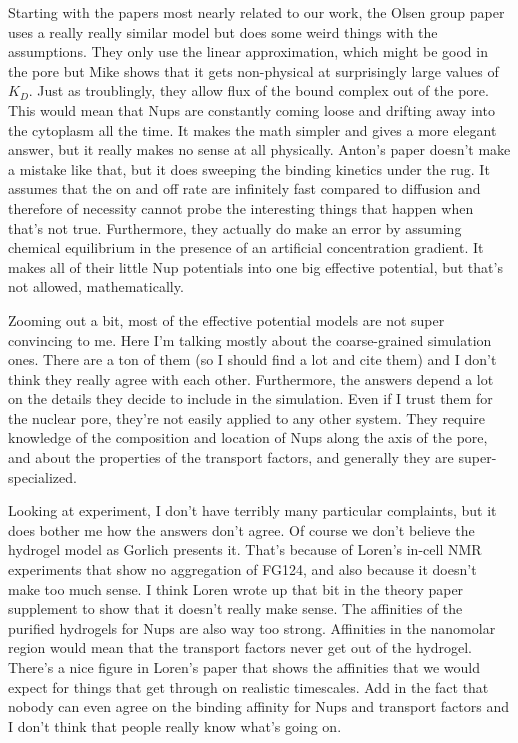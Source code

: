 {Starting with the papers most nearly related to our work, the Olsen group paper uses a really really similar model but does some weird things with the assumptions.  They only use the linear approximation, which might be good in the pore but Mike shows that it gets non-physical at surprisingly large values of $K_D$.  Just as troublingly, they allow flux of the bound complex out of the pore.  This would mean that Nups are constantly coming loose and drifting away into the cytoplasm all the time.  It makes the math simpler and gives a more elegant answer, but it really makes no sense at all physically.  Anton's paper doesn't make a mistake like that, but it does sweeping the binding kinetics under the rug.  It assumes that the on and off rate are infinitely fast compared to diffusion and therefore of necessity cannot probe the interesting things that happen when that's not true.  Furthermore, they actually do make an error by assuming chemical equilibrium in the presence of an artificial concentration gradient.  It makes all of their little Nup potentials into one big effective potential, but that's not allowed, mathematically.

Zooming out a bit, most of the effective potential models are not super convincing to me.  Here I'm talking mostly about the coarse-grained simulation ones.  There are a ton of them (so I should find a lot and cite them) and I don't think they really agree with each other.  Furthermore, the answers depend a lot on the details they decide to include in the simulation.  Even if I trust them for the nuclear pore, they're not easily applied to any other system.  They require knowledge of the composition and location of Nups along the axis of the pore, and about the properties of the transport factors, and generally they are super-specialized.

Looking at experiment, I don't have terribly many particular complaints, but it does bother me how the answers don't agree.  Of course we don't believe the hydrogel model as Gorlich presents it.  That's because of Loren's in-cell NMR experiments that show no aggregation of FG124, and also because it doesn't make too much sense.  I think Loren wrote up that bit in the theory paper supplement to show that it doesn't really make sense.  The affinities of the purified hydrogels for Nups are also way too strong.  Affinities in the nanomolar region would mean that the transport factors never get out of the hydrogel.  There's a nice figure in Loren's paper that shows the affinities that we would expect for things that get through on realistic timescales.  Add in the fact that nobody can even agree on the binding affinity for Nups and transport factors and I don't think that people really know what's going on.

}
